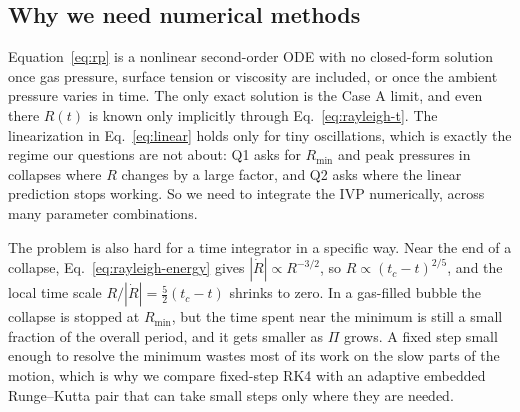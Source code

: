 \subsection{Why we need numerical methods}\label{sec:whynumerics}

Equation~\eqref{eq:rp} is a nonlinear second-order ODE with no closed-form solution once gas
pressure, surface tension or viscosity are included, or once the ambient pressure varies in
time. The only exact solution is the Case A limit, and even there $R(t)$ is known only
implicitly through Eq.~\eqref{eq:rayleigh-t}. The linearization in Eq.~\eqref{eq:linear}
holds only for tiny oscillations, which is exactly the regime our questions are not about:
Q1 asks for $R_{\min}$ and peak pressures in collapses where $R$ changes by a large factor,
and Q2 asks where the linear prediction stops working. So we need to integrate the IVP
numerically, across many parameter combinations.

The problem is also hard for a time integrator in a specific way. Near the end of a
collapse, Eq.~\eqref{eq:rayleigh-energy} gives $|\dot R| \propto R^{-3/2}$, so
$R \propto (t_c - t)^{2/5}$, and the local time scale $R/|\dot R| = \tfrac{5}{2}(t_c - t)$
shrinks to zero. In a gas-filled bubble the collapse is stopped at $R_{\min}$, but the time
spent near the minimum is still a small fraction of the overall period, and it gets smaller
as $\Pi$ grows. A fixed step small enough to resolve the minimum wastes most of its work
on the slow parts of the motion, which is why we compare fixed-step RK4 with an adaptive
embedded Runge--Kutta pair that can take small steps only where they are needed.
